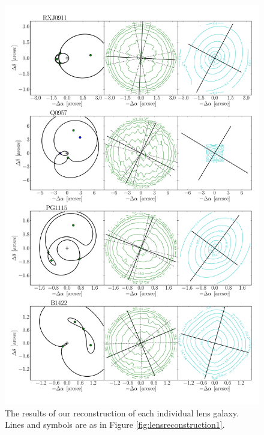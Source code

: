 \documentclass[useAMS,usenatbib]{mn2e}
\begin{document}
\begin{figure}
  \centering
  \includegraphics[width=.8\linewidth]{Figures/AllLenses32.pdf}
  \caption[width=.65\linewidth]{The results of our reconstruction of each individual lens galaxy. Lines and symbols are as in Figure \ref{fig:lensreconstruction1}.}
  \label{fig:lensreconstruction2}
\end{figure}
\end{document}
